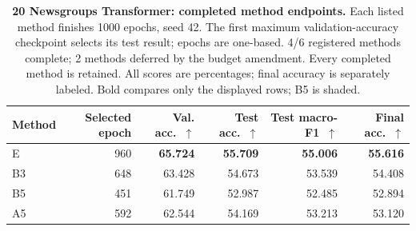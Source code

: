 \begin{table}[!htbp]
\centering
\caption{\textbf{20 Newsgroups Transformer: completed method endpoints.} Each listed method finishes 1000 epochs, seed 42. The first maximum validation-accuracy checkpoint selects its test result; epochs are one-based. 4/6 registered methods complete; 2 methods deferred by the budget amendment. Every completed method is retained. All scores are percentages; final accuracy is separately labeled. Bold compares only the displayed rows; B5 is shaded.}
\label{tab:revision-transformer-audit}
\footnotesize\setlength{\tabcolsep}{5pt}\renewcommand{\arraystretch}{1.12}
\begin{tabular}{lrrrrr}
\toprule
Method & Selected epoch & Val. acc.\ $\uparrow$ & Test acc.\ $\uparrow$ & Test macro-F1\ $\uparrow$ & Final acc.\ $\uparrow$ \\
\midrule
E & 960 & \textbf{65.724} & \textbf{55.709} & \textbf{55.006} & \textbf{55.616} \\
B3 & 648 & 63.428 & 54.673 & 53.539 & 54.408 \\
\rowcolor{oursbg}
B5 & 451 & 61.749 & 52.987 & 52.485 & 52.894 \\
A5 & 592 & 62.544 & 54.169 & 53.213 & 53.120 \\
\bottomrule
\end{tabular}
\end{table}
